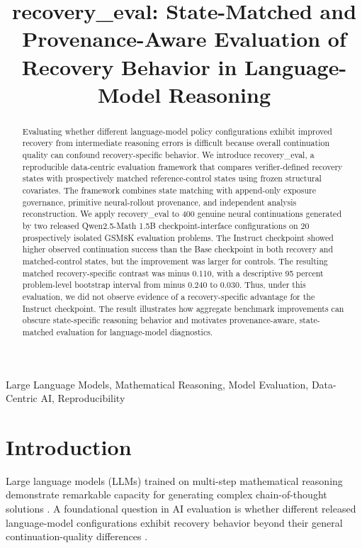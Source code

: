 \documentclass[conference]{IEEEtran}
\begin{document}
\title{recovery\_eval: State-Matched and Provenance-Aware Evaluation of Recovery Behavior in Language-Model Reasoning}

\author{
}

\maketitle

\begin{abstract}
Evaluating whether different language-model policy configurations exhibit improved recovery from intermediate reasoning errors is difficult because overall continuation quality can confound recovery-specific behavior. We introduce recovery\_eval, a reproducible data-centric evaluation framework that compares verifier-defined recovery states with prospectively matched reference-control states using frozen structural covariates. The framework combines state matching with append-only exposure governance, primitive neural-rollout provenance, and independent analysis reconstruction. We apply recovery\_eval to 400 genuine neural continuations generated by two released Qwen2.5-Math 1.5B checkpoint-interface configurations on 20 prospectively isolated GSM8K evaluation problems. The Instruct checkpoint showed higher observed continuation success than the Base checkpoint in both recovery and matched-control states, but the improvement was larger for controls. The resulting matched recovery-specific contrast was minus 0.110, with a descriptive 95 percent problem-level bootstrap interval from minus 0.240 to 0.030. Thus, under this evaluation, we did not observe evidence of a recovery-specific advantage for the Instruct checkpoint. The result illustrates how aggregate benchmark improvements can obscure state-specific reasoning behavior and motivates provenance-aware, state-matched evaluation for language-model diagnostics.
\end{abstract}

\begin{IEEEkeywords}
Large Language Models, Mathematical Reasoning, Model Evaluation, Data-Centric AI, Reproducibility
\end{IEEEkeywords}

\section{Introduction}
Large language models (LLMs) trained on multi-step mathematical reasoning demonstrate remarkable capacity for generating complex chain-of-thought solutions \cite{cobbe2021gsm8k, qwen25math2024}. A foundational question in AI evaluation is whether different released language-model configurations exhibit recovery behavior beyond their general continuation-quality differences \cite{lightman2023process, zelikman2022star, madaan2023selfrefine}.
\end{document}
